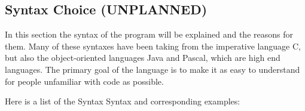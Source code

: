 \subsection{Syntax Choice (UNPLANNED)}
In this section the syntax of the program will be explained and the reasons for them. Many of these syntaxes have been taking from the imperative language C, but also the object-oriented languages Java and Pascal, which are high end languages. The primary goal of the language is to make it as easy to understand for people unfamiliar with code as possible. 

Here is a list of the Syntax %
Syntax and corresponding examples:
 \\ 

 
   
   
   

